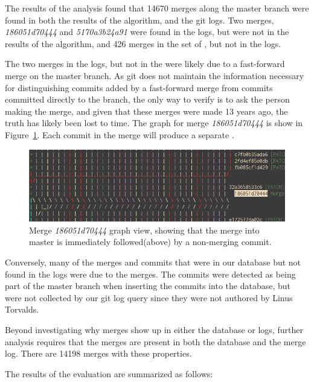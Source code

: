 The results of the analysis found that 14670 merges along the master
branch were found in both the results of the \mt{} algorithm, and the
git logs. Two merges, \emph{186051d70444} and \emph{5170a3b24a91} were
found in the logs, but were not in the results of the algorithm, and 426
merges in the set of , but not in the logs.

The two merges in the logs, but not in the \mt{} were likely due to a
fast-forward merge on the master branch.
As git does not maintain the information necessary for distinguishing
commits added by a fast-forward merge from commits committed directly to
the branch, the only way to verify is to ask the person making the
merge, and given that these merges were made 13 years ago, the truth has
likely been lost to time.
The graph for merge \emph{186051d70444} is show in Figure~\ref{fig:missing_merge}.
Each commit in the merge will produce a separate \mt{}.

\begin{figure}[htpb]
  \centering
  \includegraphics[width=0.8\linewidth]{Figures/model/18605.png}
  \caption{Merge \emph{186051d70444} graph view, showing that the merge
    into master is immediately followed(above) by a non-merging commit.}
  \label{fig:missing_merge}
\end{figure}

Conversely, many of the merges and commits that were in our database but
not found in the logs were due to the \foxtrot{} merges. The commits
were detected as being part of the master branch when inserting the
commits into the database, but were not collected by our git log query
since they were not authored by Linus Torvalds.

Beyond investigating why merges show up in either the database or logs,
further analysis requires that the merges are present in both the
database and the merge log. There are 14198 merges with these
properties.

The results of the evaluation are summarized as follows:

